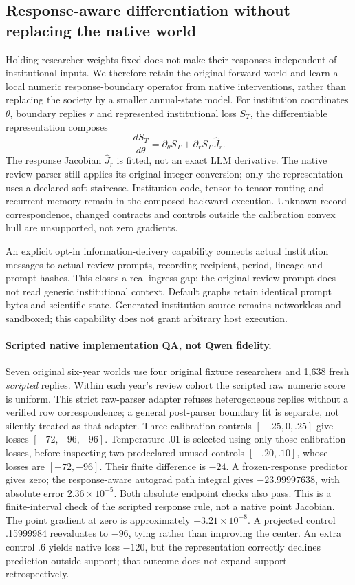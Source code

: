 \subsection{Response-aware differentiation without replacing the native world}
\label{sec:response-fidelity-v8}

Holding researcher weights fixed does not make their responses independent of
institutional inputs. We therefore retain the original forward world and learn
a local numeric response-boundary operator from native interventions, rather
than replacing the society by a smaller annual-state model. For institution
coordinates $\theta$, boundary replies $r$ and represented institutional loss
$S_T$, the differentiable representation composes
\[
 \frac{dS_T}{d\theta}=\partial_\theta S_T+
 \partial_r S_T\,\widehat J_r.
\]
The response Jacobian $\widehat J_r$ is fitted, not an exact LLM derivative.
The native review parser still applies its original integer conversion;
only the representation uses a declared soft staircase. Institution code,
tensor-to-tensor routing and recurrent memory remain in the composed backward
execution. Unknown record correspondence, changed contracts and controls
outside the calibration convex hull are unsupported, not zero gradients.

An explicit opt-in information-delivery capability connects actual institution
messages to actual review prompts, recording recipient, period, lineage and
prompt hashes. This closes a real ingress gap: the original review prompt does
not read generic institutional context. Default graphs retain identical prompt
bytes and scientific state. Generated institution source remains networkless
and sandboxed; this capability does not grant arbitrary host execution.

\paragraph{Scripted native implementation QA, not Qwen fidelity.}
Seven original six-year worlds use four original fixture researchers and
1,638 fresh \emph{scripted} replies. Within each year's review cohort the
scripted raw numeric score is uniform. This strict raw-parser adapter refuses
heterogeneous replies without a verified row correspondence; a general
post-parser boundary fit is separate, not silently treated as that adapter.
Three calibration controls
$[-.25,0,.25]$ give losses $[-72,-96,-96]$. Temperature .01 is selected using
only those calibration losses, before inspecting two predeclared unused
controls $[-.20,.10]$, whose losses are $[-72,-96]$.
Their finite difference is $-24$. A frozen-response predictor gives zero;
the response-aware autograd path integral gives $-23.99997638$, with absolute
error $2.36\times10^{-5}$. Both absolute endpoint checks also pass.
This is a finite-interval check of the scripted response rule, not a native
point Jacobian. The point gradient at zero is approximately $-3.21\times10^{-8}$.
A projected control .15999984 reevaluates to $-96$, tying rather than improving
the center. An extra control .6 yields native loss $-120$, but the representation
correctly declines prediction outside support; that outcome does not expand
support retrospectively.

